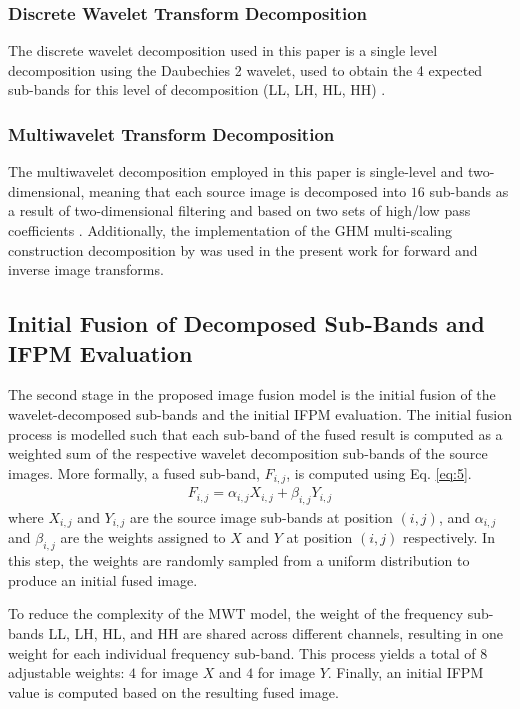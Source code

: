 \documentclass{article}
\begin{document}
\subsubsection{Discrete Wavelet Transform Decomposition}
The discrete wavelet decomposition used in this paper is a single level decomposition using the Daubechies 2 wavelet, used to obtain the 4 expected sub-bands for this level of decomposition (LL, LH, HL, HH) \cite{Pajares.Delacruz.2004}.

\subsubsection{Multiwavelet Transform Decomposition}
The multiwavelet decomposition employed in this paper is single-level and two-dimensional, meaning that each source image is decomposed into $16$ sub-bands as a result of two-dimensional filtering and based on two sets of high/low pass coefficients \cite{Wang2004}. Additionally, the implementation of the GHM multi-scaling construction decomposition by \cite{AlJewad.2006} was used in the present work for forward and inverse image transforms.

\subsection{Initial Fusion of Decomposed Sub-Bands and IFPM Evaluation}
The second stage in the proposed image fusion model is the initial fusion of the wavelet-decomposed sub-bands and the initial IFPM evaluation. The initial fusion process is modelled such that each sub-band of the fused result is computed as a weighted sum of the respective wavelet decomposition sub-bands of the source images. More formally, a fused sub-band, $F_{i,j}$, is computed using Eq. \ref{eq:5}.
\begin{gather}\label{eq:5}
F_{i,j} = \alpha_{i,j}X_{i,j} + \beta_{i,j}Y_{i,j}
\end{gather}
where $X_{i,j}$ and $Y_{i,j}$ are the source image sub-bands at position $(i,j)$, and $\alpha_{i,j}$ and $\beta_{i,j}$ are the weights assigned to $X$ and $Y$ at position $(i,j)$ respectively. In this step, the weights are randomly sampled from a uniform distribution to produce an initial fused image.

To reduce the complexity of the MWT model, the weight of the frequency sub-bands LL, LH, HL, and HH are shared across different channels, resulting in one weight for each individual frequency sub-band. This process yields a total of $8$ adjustable weights: $4$ for image $X$ and $4$ for image $Y$. Finally, an initial IFPM value is computed based on the resulting fused image.
\end{document}
